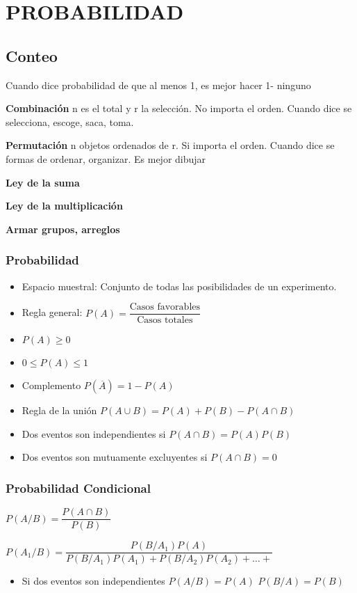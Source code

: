 \section{PROBABILIDAD}
\subsection{Conteo}
Cuando dice probabilidad de que al menos 1, es mejor hacer 1- ninguno

\textbf{Combinación}
n es el total y r la selección. No importa el orden. Cuando dice se selecciona, escoge, saca, toma.

\textbf{Permutación}
n objetos ordenados de r. Si importa el orden. Cuando dice se formas de ordenar, organizar. Es mejor dibujar

\textbf{Ley de la suma}

\textbf{Ley de la multiplicación}

\textbf{Armar grupos, arreglos}
\subsubsection{Probabilidad}
\begin{itemize}
	\item Espacio muestral: Conjunto de todas las posibilidades de un experimento.
	\item Regla general: $P(A)=\dfrac{\text{Casos favorables}}{\text{Casos totales}}$
	\item $P(A)\geq0$
	\item $0\leq P(A)\leq1$
	\item Complemento $P(\overline{A})=1-P(A)$
	\item Regla de la unión $P(A\cup B)=P(A)+P(B)-P(A\cap B)$
	\item Dos eventos son independientes si $P(A\cap B)=P(A)P(B)$
	\item Dos eventos son mutuamente excluyentes si $P(A\cap B)=0$
\end{itemize}

\subsubsection{Probabilidad Condicional}

$P(A/B)=\dfrac{P(A\cap B)}{P(B)}$

$P(A_1/B)=\dfrac{P(B/A_1)P(A)}{P(B/A_1)P(A_1)+P(B/A_2)P(A_2)+\dots+}$


\begin{itemize}
	\item Si dos eventos son independientes $P(A/B)=P(A)$ $P(B/A)=P(B)$
\end{itemize}
